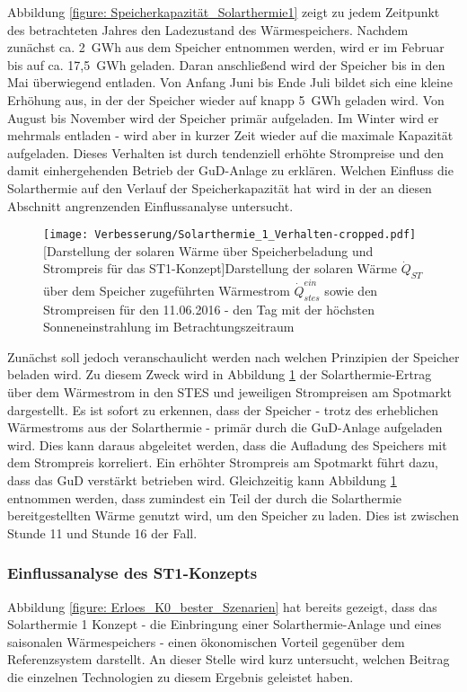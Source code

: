 Abbildung \ref{figure: Speicherkapazität_Solarthermie1} zeigt zu jedem Zeitpunkt des betrachteten Jahres den Ladezustand des Wärmespeichers. Nachdem zunächst ca. 2~GWh aus dem Speicher entnommen werden, wird er im Februar bis auf ca. 17,5~GWh geladen. Daran anschließend wird der Speicher bis in den Mai überwiegend entladen. Von Anfang Juni bis Ende Juli bildet sich eine kleine Erhöhung aus, in der der Speicher wieder auf knapp 5~GWh geladen wird. Von August bis November wird der Speicher primär aufgeladen. Im Winter wird er mehrmals entladen - wird aber in kurzer Zeit wieder auf die maximale Kapazität aufgeladen. Dieses Verhalten ist durch tendenziell erhöhte Strompreise und den damit einhergehenden Betrieb der \ac{GuD}-Anlage zu erklären. Welchen Einfluss die Solarthermie auf den Verlauf der Speicherkapazität hat wird in der an diesen Abschnitt angrenzenden Einflussanalyse untersucht.
	\begin{figure}
		\centering
		\texttt{[image: Verbesserung/Solarthermie\_1\_Verhalten-cropped.pdf]}
		[Darstellung der solaren Wärme über Speicherbeladung und Strompreis für das ST1-Konzept]{Darstellung der solaren Wärme $\dot{Q}_{ST}$ über dem Speicher zugeführten Wärmestrom $\dot{Q}_{stes}^{ein}$ sowie den Strompreisen für den 11.06.2016 - den Tag mit der höchsten Sonneneinstrahlung im Betrachtungszeitraum}
		\label{figure: Verhalten_Solarthermie1}
	\end{figure}
	
Zunächst soll jedoch veranschaulicht werden nach welchen Prinzipien der Speicher beladen wird. Zu diesem Zweck wird in Abbildung \ref{figure: Verhalten_Solarthermie1} der Solarthermie-Ertrag über dem Wärmestrom in den \ac{STES} und jeweiligen Strompreisen am Spotmarkt dargestellt. Es ist sofort zu erkennen, dass der Speicher - trotz des erheblichen Wärmestroms aus der Solarthermie - primär durch die \ac{GuD}-Anlage aufgeladen wird. Dies kann daraus abgeleitet werden, dass die Aufladung des Speichers mit dem Strompreis korreliert. Ein erhöhter Strompreis am Spotmarkt führt dazu, dass das \ac{GuD} verstärkt betrieben wird. Gleichzeitig kann Abbildung \ref{figure: Verhalten_Solarthermie1} entnommen werden, dass zumindest ein Teil der durch die Solarthermie bereitgestellten Wärme genutzt wird, um den Speicher zu laden. Dies ist zwischen Stunde 11 und Stunde 16 der Fall.

\subsubsection*{Einflussanalyse des ST1-Konzepts}
Abbildung \ref{figure: Erloes_K0_bester_Szenarien} hat bereits gezeigt, dass das Solarthermie 1 Konzept - die Einbringung einer Solarthermie-Anlage und eines saisonalen Wärmespeichers - einen ökonomischen Vorteil gegenüber dem Referenzsystem darstellt. An dieser Stelle wird kurz untersucht, welchen Beitrag die einzelnen Technologien zu diesem Ergebnis geleistet haben.

